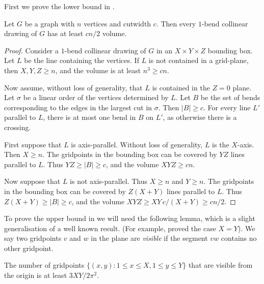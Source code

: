 \documentclass[10pt,a4paper]{article}
\begin{document}

First we prove the lower bound in .

\begin{lemma}
Let $G$ be a graph with $n$ vertices and cutwidth $c$. Then
every $1$-bend collinear drawing of $G$ has at least $cn/2$ volume.
\end{lemma}

\begin{proof} Consider a $1$-bend collinear drawing of $G$ in an $X\times
Y\times Z$  bounding box. Let $L$ be the line containing the vertices.  If $L$
is not contained in a grid-plane, then $X,Y,Z\geq n$, and the volume is at
least $n^3\geq cn$. 

Now assume, without loss of generality, that $L$ is contained in the $Z=0$
plane.  Let $\sigma$ be a linear order of the vertices determined by $L$.  Let
$B$ be the set of bends corresponding to the edges in the largest cut in
$\sigma$. Then $|B|\geq c$. For every line $L'$ parallel to $L$, there is at
most one bend in $B$ on $L'$, as otherwise there is a crossing. 

First suppose that $L$ is axis-parallel. Without loss of generality, $L$ is the
$X$-axis. Then $X\geq n$. The gridpoints in the bounding box can be covered by
$YZ$ lines parallel to $L$.  Thus $YZ\geq|B|\geq c$, and the volume $XYZ\geq
cn$.

Now suppose that $L$ is not axis-parallel. Thus $X\geq n$ and $Y\geq n$. The
gridpoints in the bounding box can be covered by $Z(X+Y)$ lines parallel to
$L$.  Thus $Z(X+Y)\geq|B|\geq c$, and the volume $XYZ\geq XY\,c/(X+Y)\geq
cn/2$. \end{proof}


To prove the upper bound in  we will need the
following lemma, which is a slight generalisation of a well known result. (For
example, \citet{PTT99} proved the case $X=Y$). We say two gridpoints $v$
and $w$ in the plane are \emph{visible} if the segment $vw$ contains no other
gridpoint.

\begin{lemma}
The number of gridpoints $\{(x,y):1\leq x\leq X,1\leq y\leq Y\}$ that are
visible from the origin is at least $3XY/2\pi^2$.
\end{lemma}
\end{document}
